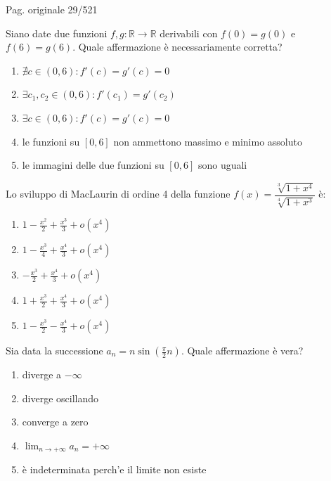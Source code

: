 \par\noindent\hfill{\color{cyan!65!black}\scriptsize Pag. originale 29/521}\par\smallskip

\begin{quiz}
Siano date due funzioni $f,g:\mathbb R\to\mathbb R$ derivabili con $f(0)=g(0)$ e $f(6)=g(6)$. Quale affermazione \`e necessariamente corretta?
\begin{enumerate}[label=\alph*),leftmargin=1.3cm,itemsep=3pt,topsep=5pt]
\item $\nexists c\in(0,6):f\prime(c)=g\prime(c)=0$
\item $\exists c_1,c_2\in(0,6):f\prime(c_1)=g\prime(c_2)$
\item $\exists c\in(0,6):f\prime(c)=g\prime(c)=0$
\item le funzioni su $[0,6]$ non ammettono massimo e minimo assoluto
\item le immagini delle due funzioni su $[0,6]$ sono uguali
\end{enumerate}
\end{quiz}

\begin{quiz}
Lo sviluppo di MacLaurin di ordine 4 della funzione $f(x)=\dfrac{\sqrt[3]{1+x^4}}{\sqrt[4]{1+x^3}}$ \`e:
\begin{enumerate}[label=\alph*),leftmargin=1.3cm,itemsep=3pt,topsep=5pt]
\item $1-\frac{x^2}2+\frac{x^3}3+o(x^4)$
\item $1-\frac{x^3}4+\frac{x^4}3+o(x^4)$
\item $-\frac{x^3}2+\frac{x^4}3+o(x^4)$
\item $1+\frac{x^3}2+\frac{x^4}3+o(x^4)$
\item $1-\frac{x^3}2-\frac{x^4}3+o(x^4)$
\end{enumerate}
\end{quiz}

\begin{quiz}
Sia data la successione $a_n=n\sin(\frac\pi2n)$. Quale affermazione \`e vera?
\begin{enumerate}[label=\alph*),leftmargin=1.3cm,itemsep=3pt,topsep=5pt]
\item diverge a $-\infty$
\item diverge oscillando
\item converge a zero
\item $\lim_{n\to+\infty}a_n=+\infty$
\item \`e indeterminata perch'e il limite non esiste
\end{enumerate}
\end{quiz}

